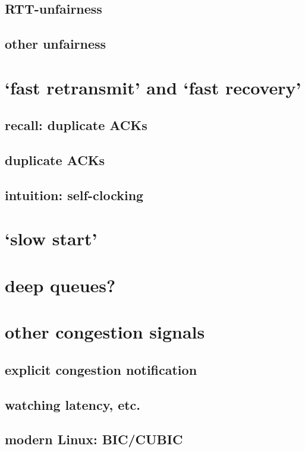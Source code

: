 \subsection{RTT-unfairness}


\subsection{other unfairness}


\section{`fast retransmit' and `fast recovery'}

\subsection{recall: duplicate ACKs}


\subsection{duplicate ACKs}

\subsection{intuition: self-clocking}


\section{`slow start'}


\section{deep queues?}



\section{other congestion signals}



\subsection{explicit congestion notification}



\subsection{watching latency, etc.}




\subsection{modern Linux: BIC/CUBIC}

